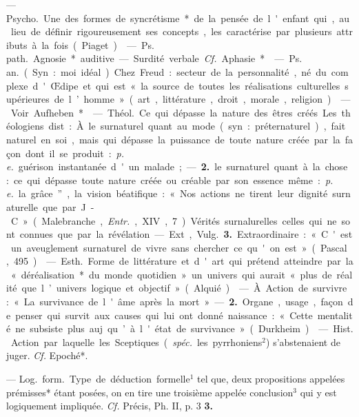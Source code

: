 \begin{itemize}[leftmargin=1cm, label=, itemsep=1pt]
 — \si{Psycho.} Une des
formes de syncrétisme* de la pensée
de l'enfant qui, au lieu de définir
rigoureusement ses concepts, les
caractérise par plusieurs attributs à
la fois (Piaget).

 — \si{Ps. path.} Agnosie* auditive. — Surdité verbale. {\it Cf.}
Aphasie*.

 — \si{Ps. an.} (Syn. : moi idéal).
Chez Freud : secteur de la personnalité, né du complexe d'Œdipe et
qui est « la source de toutes les réalisations culturelles supérieures de
l’homme » (art, littérature, droit,
morale, religion).

 — Voir Aufheben*.

 — \si{Théol.} Ce qui dépasse
la nature des êtres créés. Les théologiens dist. : À. le surnaturel quant
au mode (syn. : préternaturel), fait
naturel en soi, mais qui dépasse la
puissance de toute nature créée
par la façon dont il se produit : {\it p. e.}
guérison instantanée d'un malade;
— {\bf 2.} le surnaturel quant à la chose :
ce qui dépasse toute nature créée ou
créable par son essence même : {\it p. e.}
la grâce”, la vision béatifique : « Nos
actions ne tirent leur dignité surnaturelle que par J.-C. » (Malebranche, {\it Entr.}, XIV, 7). Vérités
surnalurelles celles qui ne sont
connues que par la révélation.

— Ext, \si{Vulg.} {\bf 3.} Extraordinaire :
« C'est un aveuglement surnaturel
de vivre sans chercher ce qu'on est »
(Pascal, 495).

 — \si{Esth.} Forme de littérature et d'art qui prétend atteindre
par la « déréalisation* du monde
quotidien » un univers qui aurait
« plus de réalité que l’univers logique et objectif » (Alquié).

 — À. Action de survivre :
« La survivance de l'âme après la
mort » — {\bf 2.} Organe, usage, façon
de penser qui survit aux causes qui
lui ont donné naissance : « Cette
mentalité ne subsiste plus auj. qu’à
l'état de survivance » (Durkheim).

 — \si{Hist.}
Action par laquelle les Sceptiques
({\it spéc.} les pyrrhoniens$^2$) s’abstenaient de juger. {\it Cf.} Epoché*.

 — \si{Log.} \si{form.} Type de
déduction formelle$^1$ tel que, deux
propositions appelées prémisses*
étant posées, on en tire une troisième appelée conclusion$^3$ qui y est
logiquement impliquée. {\it Cf.} Précis,
Ph. II, p. 3 {\bf 3.}


\end{itemize}
